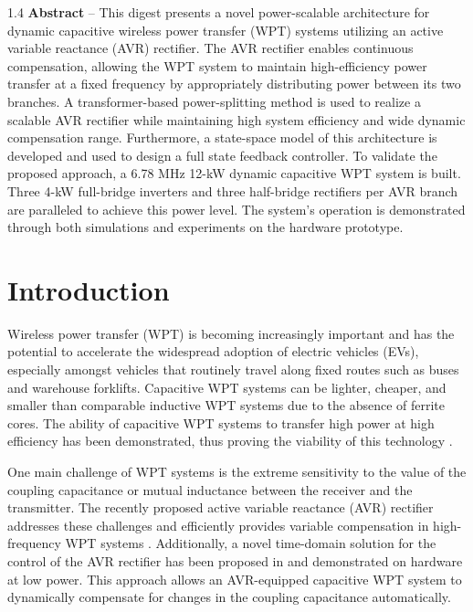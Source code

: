 \documentclass[journal, onecolumn, final, letterpaper, 11pt]{IEEEtran}
\title{\myfont{\textmd{A Scalable Dynamic Capacitive Wireless Power Transfer System Architecture}}}
\begin{document}
\maketitle
 
\doublespacing

\vspace{-0.85cm}
\begin{spacing}{1.4}
\noindent \textbf{{\small Abstract}} -- \small{This digest presents a novel power-scalable architecture for dynamic capacitive wireless power transfer (WPT) systems utilizing an active variable reactance (AVR) rectifier. The AVR rectifier enables continuous compensation, allowing the WPT system to maintain high-efficiency power transfer at a fixed frequency by appropriately distributing power between its two branches. A transformer-based power-splitting method is used to realize a scalable AVR rectifier while maintaining high system efficiency and wide dynamic compensation range. Furthermore, a state-space model of this architecture is developed and used to design a full state feedback controller. To validate the proposed approach, a 6.78 MHz 12-kW dynamic capacitive WPT system is built. Three 4-kW full-bridge inverters and three half-bridge rectifiers per AVR branch are paralleled to achieve this power level. The system's operation is demonstrated through both simulations and experiments on the hardware prototype.}
\end{spacing}

\vspace{-0.15cm}

\section{Introduction}

Wireless power transfer (WPT) is becoming increasingly important and has the potential to accelerate the widespread adoption of electric vehicles (EVs), especially amongst vehicles that routinely travel along fixed routes such as buses and warehouse forklifts. Capacitive WPT systems can be lighter, cheaper, and smaller than comparable inductive WPT systems due to the absence of ferrite cores. The ability of capacitive WPT systems to transfer high power at high efficiency has been demonstrated, thus proving the viability of this technology \cite{2025_Etta_APEC}.

One main challenge of WPT systems is the extreme sensitivity to the value of the coupling capacitance or mutual inductance between the receiver and the transmitter. The recently proposed active variable reactance (AVR) rectifier addresses these challenges and efficiently provides variable compensation in high-frequency WPT systems \cite{2019_Sinha_Journal}. Additionally, a novel time-domain solution for the control of the AVR rectifier has been proposed in \cite{2025_Liao_COMPEL} and demonstrated on hardware at low power. This approach allows an AVR-equipped capacitive WPT system to dynamically compensate for changes in the coupling capacitance automatically.
\end{document}
